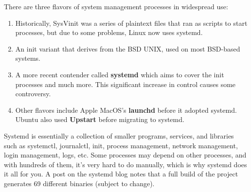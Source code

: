   There are three flavors of system management processes in widespread use: 
  \begin{enumerate}
    \item Historically, SysVinit was a series of plaintext files that ran as scripts to start processes, but due to some problems, Linux now uses systemd.
    \item An init variant that derives from the BSD UNIX, used on most BSD-based systems. 
    \item A more recent contender called \textbf{systemd} which aims to cover the init processes and much more. This significant increase in control causes some controversy. 
    \item Other flavors include Apple MacOS's \textbf{launchd} before it adopted systemd. Ubuntu also used \textbf{Upstart} before migrating to systemd. 
  \end{enumerate}

  Systemd is essentially a collection of smaller programs, services, and libraries such as systemctl, journalctl, init, process management, network management, login management, logs, etc. Some processes may depend on other processes, and with hundreds of them, it's very hard to do manually, which is why systemd does it all for you. A post on the systemd blog notes that a full build of the project generates 69 different binaries (subject to change). 

